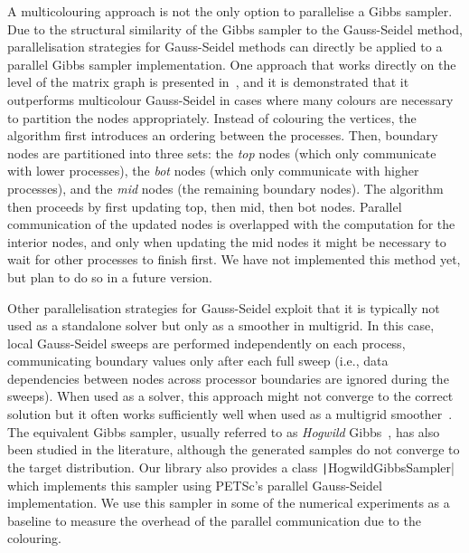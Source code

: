\documentclass[
fontsize=11pt,
paper=a4,
numbers=noenddot
]{scrartcl}
\begin{document}
A multicolouring approach is not the only option to parallelise a Gibbs sampler. Due to the structural similarity of the Gibbs sampler to the Gauss-Seidel method, parallelisation strategies for Gauss-Seidel methods can directly be applied to a parallel Gibbs sampler implementation. One approach that works directly on the level of the matrix graph is presented in~\cite{adams2001}, and it is demonstrated that it outperforms multicolour Gauss-Seidel in cases where many colours are necessary to partition the nodes appropriately. Instead of colouring the vertices, the algorithm first introduces an ordering between the processes. Then, boundary nodes are partitioned into three sets: the \emph{top} nodes (which only communicate with lower processes), the \emph{bot} nodes (which only communicate with higher processes), and the \emph{mid} nodes (the remaining boundary nodes). The algorithm then proceeds by first updating top, then mid, then bot nodes. Parallel communication of the updated nodes is overlapped with the computation for the interior nodes, and only when updating the mid nodes it might be necessary to wait for other processes to finish first. We have not implemented this method yet, but plan to do so in a future version.

Other parallelisation strategies for Gauss-Seidel exploit that it is typically not used as a standalone solver but only as a smoother in multigrid. In this case, local Gauss-Seidel sweeps are performed independently on each process, communicating boundary values only after each full sweep (i.e., data dependencies between nodes across processor boundaries are ignored during the sweeps). When used as a solver, this approach might not converge to the correct solution but it often works sufficiently well when used as a multigrid smoother~\cite{parmultigrid}. The equivalent Gibbs sampler, usually referred to as \emph{Hogwild} Gibbs~\cite{hogwild}, has also been studied in the literature, although the generated samples do not converge to the target distribution. Our library also provides a class \texttt|HogwildGibbsSampler| which implements this sampler using PETSc's parallel Gauss-Seidel implementation. We use this sampler in some of the numerical experiments as a baseline to measure the overhead of the parallel communication due to the colouring.
\end{document}
